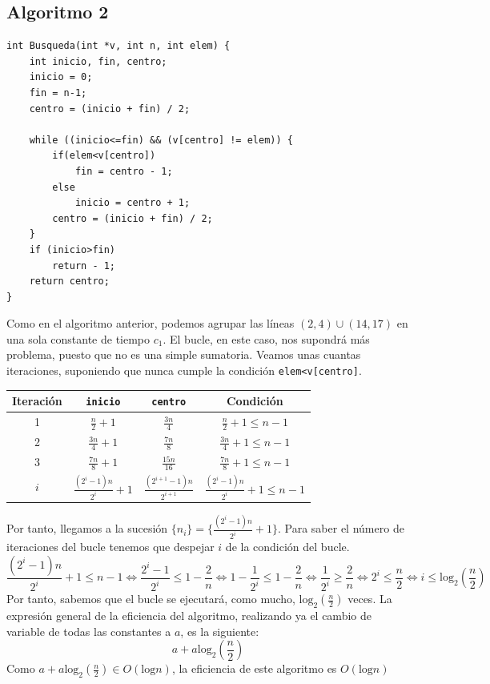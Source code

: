 \documentclass[11pt,twoside,titlepage,a4paper]{article}
\begin{document}
\subsection{Algoritmo 2}

\begin{lstlisting}
int Busqueda(int *v, int n, int elem) {
	int inicio, fin, centro;
	inicio = 0;
	fin = n-1;
	centro = (inicio + fin) / 2;

	while ((inicio<=fin) && (v[centro] != elem)) {
		if(elem<v[centro])
			fin = centro - 1;
		else
			inicio = centro + 1;
		centro = (inicio + fin) / 2;
	}
	if (inicio>fin)
		return - 1;
	return centro;
}
\end{lstlisting}
Como en el algoritmo anterior, podemos agrupar las líneas $(2,4)\cup(14,17)$ en una sola constante de 
tiempo $c_1$. El bucle, en este caso, nos supondrá más problema, puesto que no es una simple sumatoria.
Veamos unas cuantas iteraciones, suponiendo que nunca cumple la condición \texttt{elem<v[centro]}.

\begin{center}\begin{tabular}{cccc}
Iteración & \texttt{inicio} & \texttt{centro} & Condición \\ \hline
1 & $\frac n2 + 1$ & $\frac{3n}{4}$ & $\frac n2 + 1 \leq n - 1$ \\
2 & $\frac{3n}{4} + 1$ & $\frac{7n}{8}$ & $\frac{3n}{4} + 1 \leq n - 1$ \\
3 & $\frac{7n}{8} + 1$ & $\frac{15n}{16}$ & $\frac{7n}{8} + 1 \leq n - 1$ \\
$i$ & $\frac{(2^i-1)n}{2^i} + 1$ & $\frac{(2^{i+1}-1)n}{2^{i+1}}$ & $\frac{(2^i-1)n}{2^i} + 1\leq n - 1$ \\
\end{tabular}\end{center}
Por tanto, llegamos a la sucesión $\{n_i\}=\{\frac{(2^i-1)n}{2^i} + 1\}$. Para saber el número de 
iteraciones del bucle tenemos que despejar $i$ de la condición del bucle.
\begin{equation*}
\frac{(2^i-1)n}{2^i}+1 \leq n-1 \Leftrightarrow \frac{2^i-1}{2^i} \leq 1-\frac 2n \Leftrightarrow 
1-\frac{1}{2^i} \leq 1-\frac 2n \Leftrightarrow \frac{1}{2^i} \geq \frac 2n \Leftrightarrow 2^i
\leq \frac n2 \Leftrightarrow i \leq \text{log}_2(\frac n2)
\end{equation*}
Por tanto, sabemos que el bucle se ejecutará, como mucho, $\text{log}_2(\frac n2)$ veces. La expresión 
general de la eficiencia del algoritmo, realizando ya el cambio de variable de todas las constantes a $a$,
es la siguiente:
\begin{equation*}
a+a\text{log}_2(\frac n2)
\end{equation*}
Como $a+a\text{log}_2(\frac n2)\in O(\text{log}n)$, la eficiencia de este algoritmo es $O(\text{log}n)$
\clearpage
\end{document}
